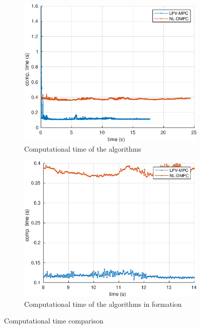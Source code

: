 \documentclass[a4paper,fleqn]{cas-sc}
\begin{document}
\begin{figure}[h]
    \centering
        \begin{subfigure}{0.5\textwidth}
        \centering
        \includegraphics[width=.9\textwidth]{figs/experiments/t_avg.eps}
        \caption{Computational time of the algorithms }
        \label{fig:Tcomp}
        \end{subfigure}%
        \begin{subfigure}{.5\textwidth}
        \centering
        \includegraphics[width=.9\textwidth]{figs/experiments/t_avg_zn.eps}
        \caption{Computational time of the algorithms in formation}
        \label{fig:Tcomp_ZIN}
        \end{subfigure}
    \caption{Computational time comparison}
    \label{fig:Dcomp}
\end{figure}
\end{document}
